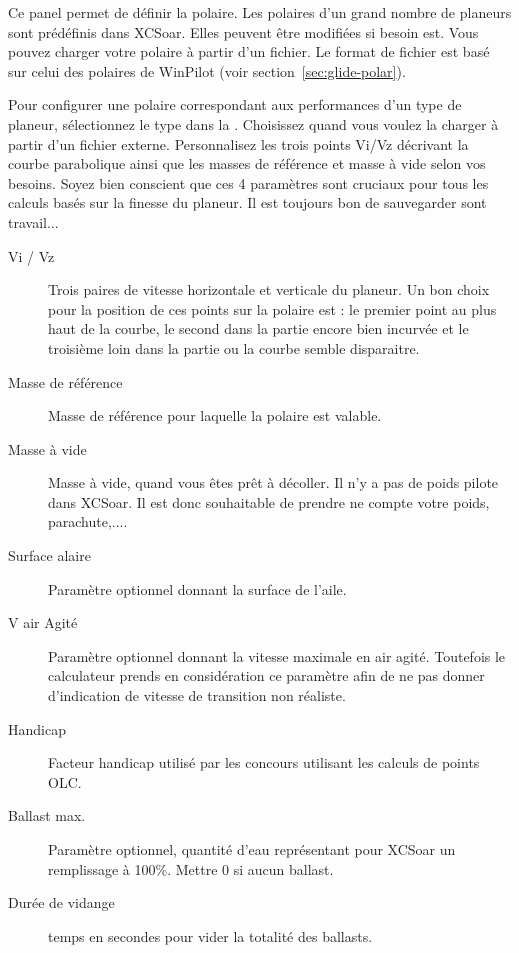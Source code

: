 Ce panel permet de définir la polaire. Les polaires d'un grand nombre de planeurs sont prédéfinis dans XCSoar. Elles peuvent être modifiées si besoin est. Vous pouvez charger votre polaire à partir d'un fichier. Le format de fichier est basé sur celui des polaires de WinPilot (voir section~\ref{sec:glide-polar}).

\label{conf:polar} Pour configurer une polaire correspondant aux performances d'un type de planeur, sélectionnez le type dans la . Choisissez  quand vous voulez la charger à partir d'un fichier externe. Personnalisez les trois points Vi/Vz décrivant la courbe parabolique ainsi que les masses de référence et masse à vide selon vos besoins.
\tip Soyez bien conscient que ces 4 paramètres sont cruciaux pour tous les calculs basés sur la finesse du planeur. 
 Il est toujours bon de sauvegarder sont travail...

\begin{description}
\item[Vi / Vz]  Trois paires de vitesse horizontale et verticale du planeur. Un bon choix pour la position de ces points sur la polaire est : le premier point au plus haut de la courbe, le second dans la partie encore bien incurvée et le troisième loin dans la partie ou la courbe semble disparaitre.
\item[Masse de référence]  Masse de référence pour laquelle la polaire est valable.
\item[Masse à vide]  Masse à vide, quand vous êtes prêt à décoller. Il n'y a pas de poids pilote dans XCSoar. Il est donc souhaitable de prendre ne compte votre poids, parachute,....
\item[Surface alaire]  Paramètre optionnel donnant la surface de l'aile.
\item[V air Agité] Paramètre optionnel donnant la vitesse maximale en air agité. Toutefois le calculateur prends en considération ce paramètre afin de ne pas donner d'indication de vitesse de transition non réaliste.
\item[Handicap]  Facteur handicap utilisé par les concours utilisant les calculs de points OLC.
\item[Ballast max.]  Paramètre optionnel, quantité d'eau représentant pour XCSoar un remplissage à 100\%. Mettre 0 si aucun ballast.
\item[Durée de vidange]  temps en secondes pour vider la totalité des ballasts.
\end{description}


